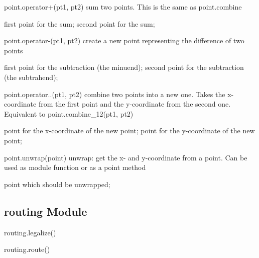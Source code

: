 \begin{APIfunc}{point.operator+(pt1, pt2)}
    sum two points. This is the same as point.combine
    \begin{APIparameters}
            first point for the sum;
            second point for the sum;
    \end{APIparameters}
\end{APIfunc}
\begin{APIfunc}{point.operator-(pt1, pt2)}
    create a new point representing the difference of two points
    \begin{APIparameters}
            first point for the subtraction (the minuend);
            second point for the subtraction (the subtrahend);
    \end{APIparameters}
\end{APIfunc}
\begin{APIfunc}{point.operator..(pt1, pt2)}
    combine two points into a new one. Takes the x-coordinate from the first point and the y-coordinate from the second one. Equivalent to point.combine\_12(pt1, pt2)
    \begin{APIparameters}
            point for the x-coordinate of the new point;
            point for the y-coordinate of the new point;
    \end{APIparameters}
\end{APIfunc}
\begin{APIfunc}{point.unwrap(point)}
    unwrap: get the x- and y-coordinate from a point. Can be used as module function or as a point method
    \begin{APIparameters}
            point which should be unwrapped;
    \end{APIparameters}
\end{APIfunc}
\subsection{routing Module}
\begin{APIfunc}{routing.legalize()}
    
    \begin{APIparameters}
    \end{APIparameters}
\end{APIfunc}
\begin{APIfunc}{routing.route()}
    
    \begin{APIparameters}
    \end{APIparameters}
\end{APIfunc}
